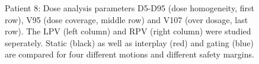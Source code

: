 \documentclass[type=dr, dr=rernat, accentcolor=tud7b,colorbacktitle, bigchapter, openright, twoside, 12pt ]{tudthesis}
\begin{document}
\begin{figure}[H]
{ }
\caption{Patient 8: Dose analysis parameters D5-D95 (dose homogeneity, first row), V95 (dose coverage, middle row) and V107 (over dosage, last row). 
The LPV (left column) and RPV (right column) were studied seperately. Static (black) as well as interplay (red) and gating (blue) 
are compared for four different motions and different safety margins.}
\label{static_interplay_gating_Pat08}
\end{figure}

\newpage


\begin{figure}[H]
 \subfigure[V95: LPV]{
}
\end{figure}
\end{document}

